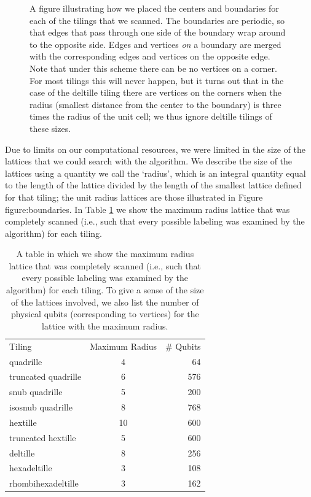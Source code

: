 \documentclass{amsbook}
\theoremstyle{plain}
\theoremstyle{definition}
\theoremstyle{remark}
\begin{document}
\begin{figure}
\caption{
\label{figure:boundaries}
A figure illustrating how we placed the centers and boundaries for each of the tilings that we scanned.  The boundaries are periodic, so that edges that pass through one side of the boundary wrap around to the opposite side.  Edges and vertices \emph{on} a boundary are merged with the corresponding edges and vertices on the opposite edge.
Note that under this scheme there can be no vertices on a corner.  For most tilings this will never happen, but it turns out that in the case of the deltille tiling there are vertices on the corners when the radius (smallest distance from the center to the boundary) is three times the radius of the unit cell;  we thus ignore deltille tilings of these sizes.
}
\end{figure}

Due to limits on our computational resources, we were limited in the size of the lattices that we could search with the algorithm.  We describe the size of the lattices using a quantity we call the `radius', which is an integral quantity equal to the length of the lattice divided by the length of the smallest lattice defined for that tiling;  the unit radius lattices are those illustrated in Figure {figure:boundaries}.  In Table \ref{table:maximum-radius-scanned} we show the maximum radius lattice that was completely scanned (i.e., such that every possible labeling was examined by the algorithm) for each tiling.

\begin{table}
\begin{tabular}{lcr}
Tiling & Maximum Radius & \# Qubits\\
quadrille & 4 & 64\\
truncated quadrille & 6 & 576\\
snub quadrille & 5 & 200\\
isosnub quadrille & 8 & 768\\
hextille & 10 & 600\\
truncated hextille & 5 & 600\\
deltille & 8 & 256\\
hexadeltille & 3 & 108\\
rhombihexadeltille & 3 & 162\\
\end{tabular}
\caption[Lattice sizes scanned for each tiling]{
\label{table:maximum-radius-scanned}
A table in which we show the maximum radius lattice that was completely scanned (i.e., such that every possible labeling was examined by the algorithm) for each tiling.  To give a sense of the size of the lattices involved, we also list the number of physical qubits (corresponding to vertices) for the lattice with the maximum radius.
}
\end{table}
\end{document}
